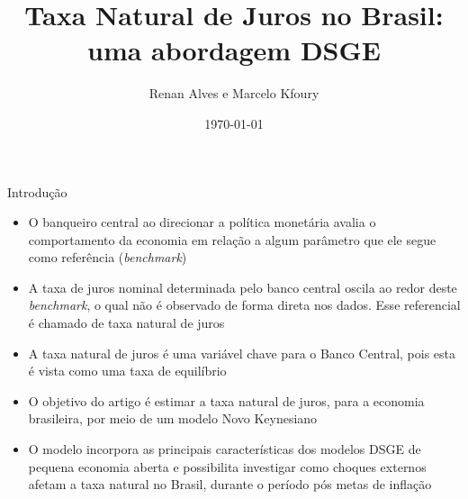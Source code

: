 \documentclass[9pt]{beamer}
\title{Taxa Natural de Juros no Brasil: uma abordagem DSGE}
\subtitle{}
\author[Renan Alves]{ Renan Alves e Marcelo Kfoury}
\date{\today}
\let\olditem\item
\renewcommand{\item}{%
\olditem\vspace{\fill}}
\begin{document}
\maketitle


\begin{frame}{Introdução}
\begin{itemize}

\item O banqueiro central ao direcionar a política monetária avalia o comportamento da economia em relação a algum parâmetro que ele segue como referência (\textit{benchmark}) 

\item A taxa de juros nominal determinada pelo banco central oscila ao redor deste \textit{benchmark}, o qual não é observado de forma direta nos dados. Esse referencial é chamado de taxa natural de juros

\item A taxa natural de juros é uma variável chave para o Banco Central, pois esta é vista como uma taxa de equilíbrio

\item O objetivo do artigo é estimar a taxa natural de juros, para a economia brasileira, por meio de um modelo Novo Keynesiano

\item O modelo incorpora as principais características dos modelos DSGE de pequena economia aberta e possibilita investigar como choques externos afetam a taxa natural no Brasil, durante o período pós metas de inflação


\end{itemize}
\end{frame}
\end{document}
